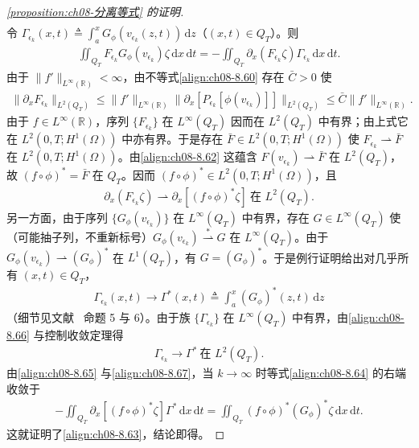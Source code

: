 \documentclass[../../main.tex]{subfiles}%
\begin{document}
\begin{proof}[\cref{proposition:ch08-分离等式} 的证明]
\begin{align}
\end{align}
令 $\Gamma_{\epsilon_k}(x,t)\triangleq \int_a^x G_\phi(v_{\epsilon_k}(z,t))\,\mathrm{d}z$（$(x,t)\in Q_T$）。则
\begin{align}
\iint_{Q_T}F_{\epsilon_k}G_\phi(v_{\epsilon_k})\zeta\,\mathrm{d}x\,\mathrm{d}t
=-\iint_{Q_T}\partial_x(F_{\epsilon_k}\zeta)\Gamma_{\epsilon_k}\,\mathrm{d}x\,\mathrm{d}t. \label{align:ch08-8.64}
\end{align}
由于 $\|f'\|_{L^\infty(\mathbb{R})}<\infty$，由不等式\eqref{align:ch08-8.60} 存在 $\bar C>0$ 使
\begin{align*}
\|\partial_x F_{\epsilon_k}\|_{L^2(Q_T)}
\leqslant\|f'\|_{L^\infty(\mathbb{R})}\|\partial_x[P_{\epsilon_k}[\phi(v_{\epsilon_k})]]\|_{L^2(Q_T)}
\leqslant\bar C\|f'\|_{L^\infty(\mathbb{R})}.
\end{align*}
由于 $f\in L^\infty(\mathbb{R})$，序列 $\{F_{\epsilon_k}\}$ 在 $L^\infty(Q_T)$ 因而在 $L^2(Q_T)$ 中有界；由上式它在 $L^2(0,T;H^1(\Omega))$ 中亦有界。于是存在 $\bar F\in L^2(0,T;H^1(\Omega))$ 使 $F_{\epsilon_k}\rightharpoonup\bar F$ 在 $L^2(0,T;H^1(\Omega))$。由\eqref{align:ch08-8.62} 这蕴含 $F(v_{\epsilon_k})\rightharpoonup\bar F$ 在 $L^2(Q_T)$，故 $(f\circ\phi)^*=\bar F$ 在 $Q_T$。因而 $(f\circ\phi)^*\in L^2(0,T;H^1(\Omega))$，且
\begin{align}
\partial_x(F_{\epsilon_k}\zeta)\rightharpoonup\partial_x[(f\circ\phi)^*\zeta]\ \text{在 }L^2(Q_T). \label{align:ch08-8.65}
\end{align}
另一方面，由于序列 $\{G_\phi(v_{\epsilon_k})\}$ 在 $L^\infty(Q_T)$ 中有界，存在 $G\in L^\infty(Q_T)$ 使（可能抽子列，不重新标号）$G_\phi(v_{\epsilon_k})\stackrel{*}{\rightharpoonup}G$ 在 $L^\infty(Q_T)$。由于 $G_\phi(v_{\epsilon_k})\rightharpoonup(G_\phi)^*$ 在 $L^1(Q_T)$，有 $G=(G_\phi)^*$。于是例行证明给出对几乎所有 $(x,t)\in Q_T$，
\begin{align}
\Gamma_{\epsilon_k}(x,t)\to\Gamma^*(x,t)\triangleq \int_a^x(G_\phi)^*(z,t)\,\mathrm{d}z \label{align:ch08-8.66}
\end{align}
（细节见文献~\cite{ref100} 命题 5 与 6）。由于族 $\{\Gamma_{\epsilon_k}\}$ 在 $L^\infty(Q_T)$ 中有界，由\eqref{align:ch08-8.66} 与控制收敛定理得
\begin{align}
\Gamma_{\epsilon_k}\to\Gamma^*\ \text{在 }L^2(Q_T). \label{align:ch08-8.67}
\end{align}
由\eqref{align:ch08-8.65} 与\eqref{align:ch08-8.67}，当 $k\to\infty$ 时等式\eqref{align:ch08-8.64} 的右端收敛于
\begin{align*}
-\iint_{Q_T}\partial_x[(f\circ\phi)^*\zeta]\Gamma^*\,\mathrm{d}x\,\mathrm{d}t
=\iint_{Q_T}(f\circ\phi)^*(G_\phi)^*\zeta\,\mathrm{d}x\,\mathrm{d}t.
\end{align*}
这就证明了\eqref{align:ch08-8.63}，结论即得。
\end{proof}
\end{document}

